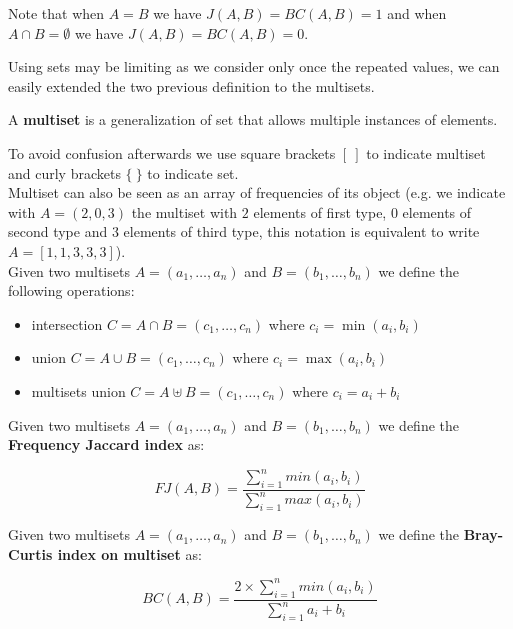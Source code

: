 Note that when $A = B$ we have $J(A,B) = BC(A,B) = 1$ and when $A \cap B = \emptyset$ we have $J(A,B) = BC(A,B) = 0$.

Using sets may be limiting as we consider only once the repeated values, we can easily extended the two previous definition to the multisets.\\

\begin{definizione}
	A \textbf{multiset} is a generalization of set that allows multiple instances of elements.
\end{definizione}

To avoid confusion afterwards we use square brackets $[\ ]$ to indicate multiset and curly brackets $\{\ \}$ to indicate set.\\

Multiset can also be seen as an array of frequencies of its object (e.g. we indicate with $A = (2, 0, 3)$ the multiset with $2$ elements of first type, $0$ elements of second type and $3$ elements of third type, this notation is equivalent to write $A = [1, 1, 3, 3, 3]$).\\

Given two multisets $A = (a_{1}, \ldots, a_{n}) $ and $B = (b_{1}, \ldots, b_{n})$ we define the following operations:

\begin{itemize}
  \item intersection $C = A \cap B  = (c_{1}, \ldots, c_{n})$ where $c_{i} = \min(a_{i}, b_{i})$
  \item union $C = A \cup B  = (c_{1}, \ldots, c_{n})$ where $c_{i} = \max(a_{i}, b_{i})$
  \item multisets union $C = A \uplus B  = (c_{1}, \ldots, c_{n})$ where $c_{i} = a_{i} + b_{i}$
\end{itemize}

\begin{definizione}\label{def:wjaccard}
    Given two multisets $A = (a_{1}, \ldots, a_{n}) $ and $B = (b_{1}, \ldots, b_{n})$ we define the \textbf{Frequency Jaccard index} as:
    
    \begin{equation}
    FJ(A,B) = \frac{\sum\limits_{i=1}^n { min(a_{i}, b_{i}) } }{\sum\limits_{i=1}^n { max(a_{i}, b_{i}) }}
    \end{equation}
    
\end{definizione}


\begin{definizione}\label{def:wbray}
    Given two multisets $A = (a_{1}, \ldots, a_{n}) $ and $B = (b_{1}, \ldots, b_{n})$ we define the \textbf{Bray-Curtis index on multiset} as:
    
    \begin{equation}
    BC(A,B) = \frac{ 2 \times \sum\limits_{i=1}^n { min(a_{i}, b_{i}) } }{\sum\limits_{i=1}^n {a_{i} + b_{i}}}
    \end{equation}
    
\end{definizione}

